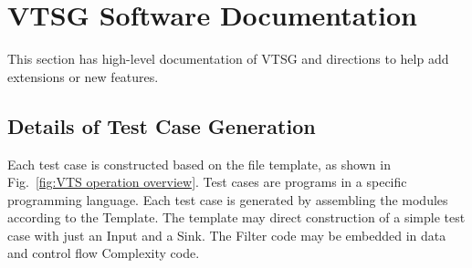 \section{VTSG Software Documentation}
\label{sec: high-level documentation}

This section has high-level documentation of VTSG and directions to help add
extensions or new features.

\subsection{Details of Test Case Generation}
\label{sec: generation detail}

Each test case is constructed based on the file template, as shown in
Fig.~\ref{fig:VTS operation overview}. Test cases are programs in a specific
programming language.  Each test case is generated by assembling the modules
according to the Template.  The template may direct construction of a simple
test case with just an Input and a Sink.  The Filter code may be embedded in
data and control flow Complexity code.

